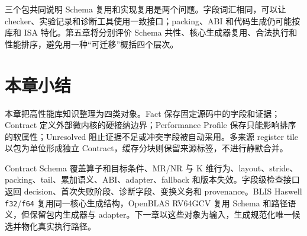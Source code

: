三个包共同说明 Schema 复用和实现复用是两个问题。字段词汇相同，可以让 checker、实验记录和诊断工具使用一致接口；packing、ABI 和代码生成仍可能按库和 ISA 特化。第五章将分别评价 Schema 共性、核心生成器复用、合法执行和性能排序，避免用一种“可迁移”概括四个层次。

\section{本章小结}

本章把高性能库知识整理为四类对象。Fact 保存固定源码中的字段和证据；Contract 定义外部微内核的硬接纳边界；Performance Profile 保存只能影响排序的软属性；Unresolved 阻止证据不足或冲突字段被自动采用。多来源 register tile 以包为单位形成独立 Contract，缓存分块则保留来源标签，不进行静默合并。

Contract Schema 覆盖算子和目标条件、MR/NR 与 K 维行为、layout、stride、packing、tail、累加语义、ABI、adapter、fallback 和版本失效。字段级检查接口返回 decision、首次失败阶段、诊断字段、变换义务和 provenance。BLIS Haswell \texttt{f32}/\texttt{f64} 复用同一核心生成结构，OpenBLAS RV64GCV 复用 Schema 和路径语义，但保留包内生成器与 adapter。下一章以这些对象为输入，生成规范化唯一候选并物化真实执行路径。
